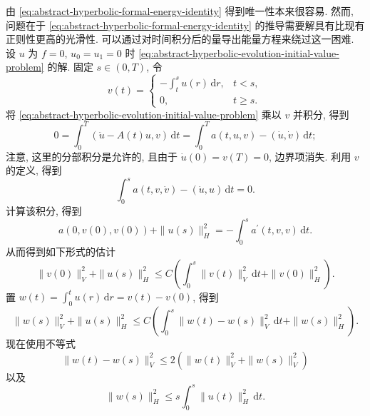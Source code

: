 由 \eqref{eq:abstract-hyperbolic-formal-energy-identity} 得到唯一性本来很容易. 然而, 问题在于 \eqref{eq:abstract-hyperbolic-formal-energy-identity} 的推导需要解具有比现有正则性更高的光滑性. 可以通过对时间积分后的量导出能量方程来绕过这一困难. 设 $u$ 为 $f=0$, $u_0=u_1=0$ 时 \eqref{eq:abstract-hyperbolic-evolution-initial-value-problem} 的解. 固定 $s\in(0,T)$, 令
\begin{equation}\label{eq:abstract-hyperbolic-uniqueness-integrated-test-function}
v(t)=\begin{cases}-\int_t^s u(r)\,\mathrm{d}r,&t<s,\\0,&t\geq s.\end{cases}
\end{equation}
将 \eqref{eq:abstract-hyperbolic-evolution-initial-value-problem} 乘以 $v$ 并积分, 得到
\begin{equation}\label{eq:abstract-hyperbolic-uniqueness-integrated-zero-identity}
0=\int_0^T(\ddot u-A(t)u,v)\,\mathrm{d}t=\int_0^T a(t,u,v)-(\dot u,\dot v)\,\mathrm{d}t;
\end{equation}
注意, 这里的分部积分是允许的, 且由于 $\dot u(0)=v(T)=0$, 边界项消失. 利用 $v$ 的定义, 得到
\begin{equation}\label{eq:abstract-hyperbolic-uniqueness-primitive-energy-pairing}
\int_0^s a(t,v,\dot v)-(\dot u,u)\,\mathrm{d}t=0.
\end{equation}
计算该积分, 得到
\begin{equation}\label{eq:abstract-hyperbolic-uniqueness-primitive-energy-identity}
a(0,v(0),v(0))+\|u(s)\|_H^2=-\int_0^s a^{\prime}(t,v,v)\,\mathrm{d}t.
\end{equation}
从而得到如下形式的估计
\begin{equation}\label{eq:abstract-hyperbolic-uniqueness-primitive-energy-bound}
\|v(0)\|_V^2+\|u(s)\|_H^2\leq C\left(\int_0^s\|v(t)\|_V^2\,\mathrm{d}t+\|v(0)\|_H^2\right).
\end{equation}
置 $w(t)=\int_0^t u(r)\,\mathrm{d}r=v(t)-v(0)$, 得到
\begin{equation}\label{eq:abstract-hyperbolic-uniqueness-zero-initial-primitive-bound}
\|w(s)\|_V^2+\|u(s)\|_H^2\leq C\left(\int_0^s\|w(t)-w(s)\|_V^2\,\mathrm{d}t+\|w(s)\|_H^2\right).
\end{equation}
现在使用不等式
\begin{equation}\label{eq:abstract-hyperbolic-primitive-difference-triangle-bound}
\|w(t)-w(s)\|_V^2\leq2(\|w(t)\|_V^2+\|w(s)\|_V^2)
\end{equation}
以及
\begin{equation}\label{eq:abstract-hyperbolic-primitive-cauchy-schwarz-bound}
\|w(s)\|_H^2\leq s\int_0^s\|u(t)\|_H^2\,\mathrm{d}t.
\end{equation}
